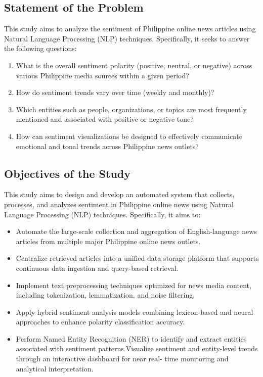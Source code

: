 \subsection{Statement of the Problem}
This study aims to analyze the sentiment of Philippine online news articles using Natural Language Processing (NLP) techniques. Specifically, it seeks to answer the following questions:

\begin{enumerate}
\def\labelenumi{\arabic{enumi}.}
\item
  What is the overall sentiment polarity (positive, neutral, or negative) across various Philippine media sources within a given period?
\item
  How do sentiment trends vary over time (weekly and monthly)?
\item
  Which entities such as people, organizations, or topics are most frequently mentioned and associated with positive or negative tone?
\item
  How can sentiment visualizations be designed to effectively communicate emotional and tonal trends across Philippine news outlets?
\end{enumerate}

\subsection{Objectives of the Study}
This study aims to design and develop an automated system that collects, processes, and analyzes sentiment in Philippine online news using Natural Language Processing (NLP) techniques. Specifically, it aims to:
\begin{itemize}
\item Automate the large-scale collection and aggregation of English-language news articles from multiple major Philippine online news outlets.
\item Centralize retrieved articles into a unified data storage platform that supports continuous data ingestion and query-based retrieval.
\item Implement text preprocessing techniques optimized for news media content, including tokenization, lemmatization, and noise filtering.
\item Apply hybrid sentiment analysis models combining lexicon-based and neural approaches to enhance polarity classification accuracy.
\item Perform Named Entity Recognition (NER) to identify and extract entities associated with sentiment patterns.Visualize sentiment and entity-level trends through an interactive dashboard for near real- time monitoring and analytical interpretation.
\end{itemize}
